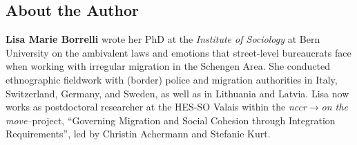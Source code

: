 \subsection{About the Author}
\label{paper4:colophon}

\textbf{Lisa Marie Borrelli} wrote her PhD at the \textit{Institute of Sociology} at Bern University on the ambivalent laws and emotions that street-level bureaucrats face when working with irregular migration in the Schengen Area. She conducted ethnographic fieldwork with (border) police and migration authorities in Italy, Switzerland, Germany, and Sweden, as well as in Lithuania and Latvia. Lisa now works as postdoctoral researcher at the HES-SO Valais within the \textit{nccr$\longrightarrow$on the move}--project, \enquote{Governing Migration and Social Cohesion through Integration Requirements}, led by Christin Achermann and Stefanie Kurt.